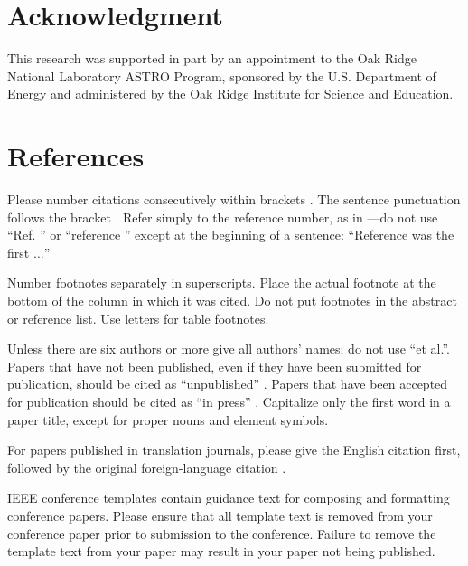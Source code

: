 \documentclass[conference]{IEEEtran}
\begin{document}
\section*{Acknowledgment}
 This research was supported in part by an appointment to the Oak Ridge National Laboratory ASTRO Program, sponsored by the U.S. Department of Energy and administered by the Oak Ridge Institute for Science and Education.



\section*{References}

Please number citations consecutively within brackets \cite{b1}. The 
sentence punctuation follows the bracket \cite{b2}. Refer simply to the reference 
number, as in \cite{b3}---do not use ``Ref. \cite{b3}'' or ``reference \cite{b3}'' except at 
the beginning of a sentence: ``Reference \cite{b3} was the first $\ldots$''

Number footnotes separately in superscripts. Place the actual footnote at 
the bottom of the column in which it was cited. Do not put footnotes in the 
abstract or reference list. Use letters for table footnotes.

Unless there are six authors or more give all authors' names; do not use 
``et al.''. Papers that have not been published, even if they have been 
submitted for publication, should be cited as ``unpublished'' \cite{b4}. Papers 
that have been accepted for publication should be cited as ``in press'' \cite{b5}. 
Capitalize only the first word in a paper title, except for proper nouns and 
element symbols.

For papers published in translation journals, please give the English 
citation first, followed by the original foreign-language citation \cite{b6}.



\vspace{12pt}
\color{red}
IEEE conference templates contain guidance text for composing and formatting conference papers. Please ensure that all template text is removed from your conference paper prior to submission to the conference. Failure to remove the template text from your paper may result in your paper not being published.
\end{document}
